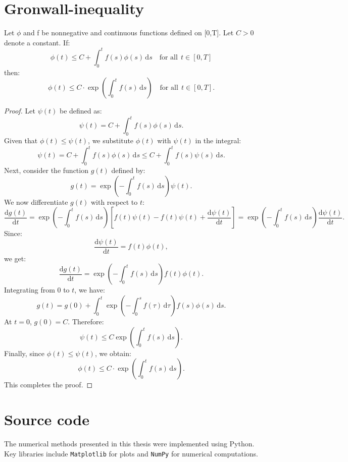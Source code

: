 



\chapter{Gronwall-inequality}
\label{Gronwall}
\begin{lemma}
Let \(\phi\) and f be nonnegative and continuous functions defined on [0,T]. Let $C>0$ denote a constant. If:
\[\phi(t)\leq C + \int_0^t \! f(s)\phi(s)\,\mathrm{d}s\quad\text{for all}\:\:t\in[0,T]\]
then:
\[\phi(t)\leq C\cdot\exp(\int_0^t \! f(s)\,\mathrm{d}s) \quad\text{for all}\:\:t\in[0,T].\]
\end{lemma}
\begin{proof}

Let \(\psi(t)\) be defined as:
\[
\psi(t) = C + \int_0^t \! f(s)\phi(s)\,\mathrm{d}s.
\]
Given that \(\phi(t) \leq \psi(t)\), we substitute \(\phi(t)\) with \(\psi(t)\) in the integral:
\[
\psi(t) = C + \int_0^t \! f(s)\phi(s)\,\mathrm{d}s \leq C + \int_0^t \! f(s)\psi(s)\,\mathrm{d}s.
\]
Next, consider the function \(g(t)\) defined by:
\[
g(t) = \exp\left(-\int_0^t \! f(s)\,\mathrm{d}s\right)\psi(t).
\]
We now differentiate \(g(t)\) with respect to \(t\):
\[
\frac{\mathrm{d}g(t)}{\mathrm{d}t} = \exp\left(-\int_0^t \! f(s)\,\mathrm{d}s\right)\left[f(t)\psi(t) - f(t)\psi(t) + \frac{\mathrm{d}\psi(t)}{\mathrm{d}t}\right] = \exp\left(-\int_0^t \! f(s)\,\mathrm{d}s\right)\frac{\mathrm{d}\psi(t)}{\mathrm{d}t}.
\]
Since:
\[
\frac{\mathrm{d}\psi(t)}{\mathrm{d}t} = f(t)\phi(t),
\]
we get:
\[
\frac{\mathrm{d}g(t)}{\mathrm{d}t} = \exp\left(-\int_0^t \! f(s)\,\mathrm{d}s\right)f(t)\phi(t).
\]
Integrating from \(0\) to \(t\), we have:
\[
g(t) = g(0) + \int_0^t \exp\left(-\int_0^s \! f(\tau)\,\mathrm{d}\tau\right)f(s)\phi(s)\,\mathrm{d}s.
\]
At \(t = 0\), \(g(0) = C\). Therefore:
\[
\psi(t) \leq C\exp\left(\int_0^t \! f(s)\,\mathrm{d}s\right).
\]
Finally, since \(\phi(t) \leq \psi(t)\), we obtain:
\[
\phi(t) \leq C\cdot\exp\left(\int_0^t \! f(s)\,\mathrm{d}s\right).
\]
This completes the proof.

\end{proof}

\chapter{Source code}
\label{code}
The numerical methods presented in this thesis were implemented using Python. Key libraries include \texttt{Matplotlib} for plots and \texttt{NumPy} for numerical computations.

